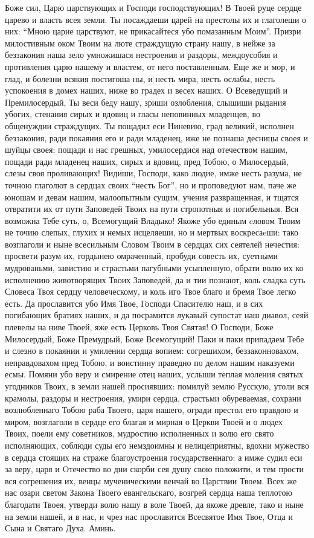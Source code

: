 Боже сил, Царю царствующих и Господи господствующих! В Твоей руце сердце царево и власть всея земли. Ты посаждаеши царей на престолы их и глаголеши о них: “Мною царие царствуют, не прикасайтеся убо помазанным Моим”. Призри милостивным оком Твоим на люте страждущую страну нашу, в нейже за беззакония наша зело умножишася нестроения и раздоры, междоусобия и противления царю нашему и властем, от него поставленным. Еще же и мор, и глад, и болезни всякия постигоша ны, и несть мира, несть ослабы, несть успокоения в домех наших, ниже во градех и весех наших. О Всеведущий и Премилосердый, Ты веси беду нашу, зриши озлобления, слышиши рыдания убогих, стенания сирых и вдовиц и гласы неповинных младенцев, во общенуждии страждущих. Ты пощадил еси Ниневию, град великий, исполнен беззакония, ради покаяния его и ради младенец, иже не познаша десницы своея и шуйцы своея; пощади и нас грешных, умилосердися над отечеством нашим, пощади ради младенец наших, сирых и вдовиц, пред Тобою, о Милосердый, слезы своя проливающих! Видиши, Господи, како людие, имже несть разума, не точною глаголют в сердцах своих “несть Бог”, но и проповедуют нам, паче же юношам и девам нашим, малоопытным сущим, учения развращенная, и тщатся отвратити их от пути Заповедей Твоих на пути стропотныя и погибельныя. Вся возможна Тебе суть, о, Всемогущий Владыко! Якоже убо единым cловом Твоим не точию слепых, глухих и немых исцеляеши, но и мертвых воскресаeши: тако возглаголи и ныне всесильным Словом Твоим в сердцах сих сеятелей нечестия: просвети разум их, гордынею омраченный, пробуди совесть их, суетными мудрованьми, завистию и страстьми пагубными усыпленную, обрати волю их ко исполнению животворящих Твоих Заповедей, да и тии познают, коль сладка суть Словеса Твоя сердцу человеческому, и коль иго Твое благо и бремя Твое легко есть. Да прославится убо Имя Твое, Господи Спасителю наш, и в сих погибающих братиях наших, и да посрамится лукавый супостат наш диавол, сеяй плевелы на ниве Твоей, яже есть Церковь Твоя Святая! О Господи, Боже Милосердый, Боже Премудрый, Боже Всемогущий! Паки и паки припадаем Тебе и слезно в покаянии и умилении сердца вопием: согрешихом, беззаконновахом, неправдовахом пред Тобою, и воистинну праведно по делом нашим наказуеми есмы. Помяни убо веру и смирение отец наших, услыши теплая моления святых угодников Твоих, в земли нашей просиявших: помилуй землю Русскую, утоли вся крамолы, раздоры и нестроения, умири сердца, страстьми обуреваемая, сохрани возлюбленнаго Тобою раба Твоего, царя нашего, огради престол его правдою и миром, возглаголи в сердце его благая и мирная о Церкви Твоей и о людех Твоих, поели ему советников, мудростию исполненных и волю его свято исполняющих, соблюди суды его немздоимны и нелицеприятны, вдохни мужество в сердца стоящих на страже благоустроения государственнаго: а имже судил еси за веру, царя и Oтечество во дни скорби сея душу свою положити, и тем прости вся согрешения их, венцы мученическими венчай во Царствии Твоем. Всех же нас озари светом Закона Твоего евангельскаго, возгрей сердца наша теплотою благодати Твоея, утверди волю нашу в воле Твоей, да якоже древле, тако и ныне на земли нашей, и в нас, и чрез нас прославится Всесвятое Имя Твое, Отца и Сына и Святаго Духа. Аминь. 






